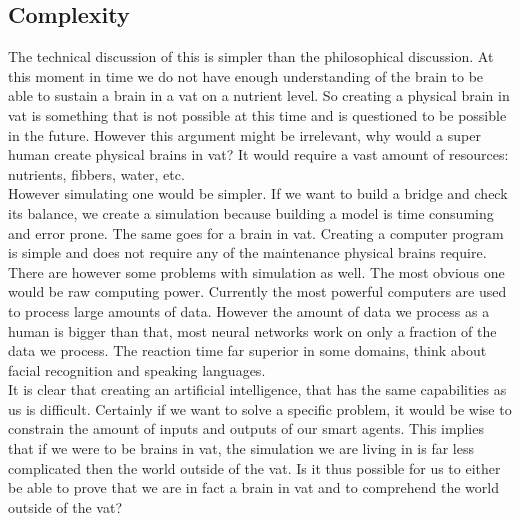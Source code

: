 \documentclass[a4paper]{article}
\begin{document}
\subsection{Complexity}
The technical discussion of this is simpler than the philosophical discussion. At this moment in time we do not have enough understanding of the brain to be able to sustain a brain in a vat on a nutrient level. So creating a physical brain in vat is something that is not possible at this time and is questioned to be possible in the future. However this argument might be irrelevant, why would a super human create physical brains in vat? It would require a vast amount of resources: nutrients, fibbers, water, etc.\\
However simulating one would be simpler. If we want to build a bridge and check its balance, we create a simulation because building a model is time consuming and error prone. The same goes for a brain in vat. Creating a computer program is simple and does not require any of the maintenance physical brains require.\\
There are however some problems with simulation as well. The most obvious one would be raw computing power. Currently the most powerful computers are used to process large amounts of data. However the amount of data we process as a human is bigger than that, most neural networks work on only a fraction of the data we process. The reaction time far superior in some domains, think about facial recognition and speaking languages.\\
It is clear that creating an artificial intelligence, that has the same capabilities as us is difficult. Certainly if we want to solve a specific problem, it would be wise to constrain the amount of inputs and outputs of our smart agents. This implies that if we were to be brains in vat, the simulation we are living in is far less complicated then the world outside of the vat. Is it thus possible for us to either be able to prove that we are in fact a brain in vat and to comprehend the world outside of the vat?\\
\end{document}
